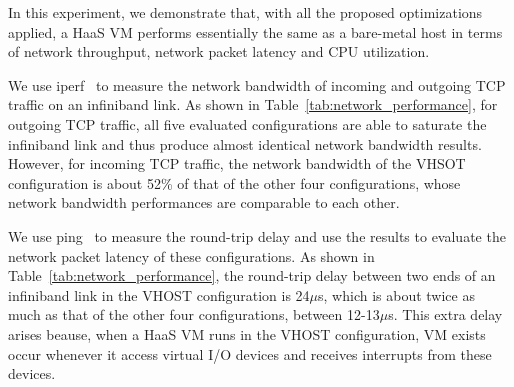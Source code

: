 In this experiment, we demonstrate that, with all  the proposed optimizations applied,  a HaaS VM performs 
essentially the same as a bare-metal host in terms of network throughput, network packet latency and 
CPU utilization.



We use  iperf~\cite{iperf} to measure the network bandwidth of 
incoming and outgoing TCP traffic on an infiniband link.
As shown in Table~\ref{tab:network_performance}, for outgoing TCP traffic, 
all five evaluated configurations are able to saturate the infiniband link and 
thus produce almost identical network bandwidth results. 
However, for incoming TCP  traffic, the network bandwidth of the VHSOT configuration 
is about 52\% of that of the other four configurations, whose network bandwidth performances
are comparable to each other.


We use ping~\cite{ping} to measure the round-trip delay and use the results to
evaluate the network packet latency of these configurations. 
As shown in Table~\ref{tab:network_performance}, the round-trip delay between 
two ends of an infiniband link in the 
VHOST configuration is 24$\mu$s, which is about twice as much as that of the other four configurations,
between 12-13$\mu$s.
This extra delay arises beause, when a HaaS VM runs in the VHOST configuration, VM exists occur whenever it
access virtual I/O devices and receives interrupts from these devices.






